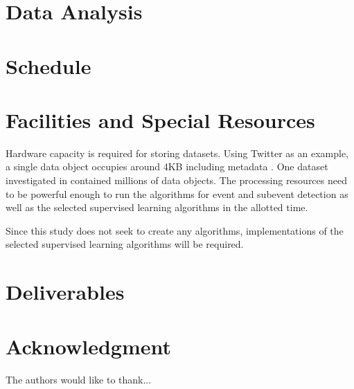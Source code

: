 \documentclass[conference]{IEEEtran}
\begin{document}
\section{Data Analysis}
\section{Schedule}



\section{Facilities and Special Resources}
Hardware capacity is required for storing datasets. Using Twitter as an example, a single data object occupies around 4KB including metadata \cite{Imran}. One dataset investigated in \cite{vieweg2014} contained millions of data objects. The processing resources need to be powerful enough to run the algorithms for event and subevent detection as well as the selected supervised learning algorithms in the allotted time.

Since this study does not seek to create any algorithms, implementations of the selected supervised learning algorithms will be required.


\section{Deliverables}




\section*{Acknowledgment}


The authors would like to thank...














\end{document}
